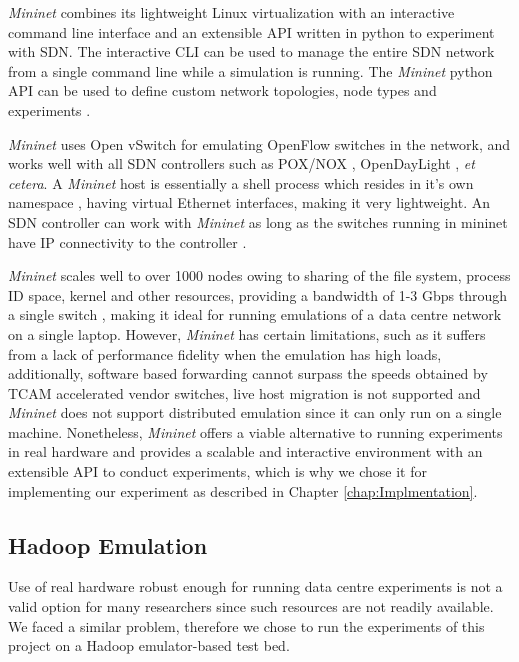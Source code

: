 \textit{Mininet} combines its lightweight Linux virtualization with an interactive command line interface and an extensible API written in python to experiment with SDN. The interactive CLI can be used to manage the entire SDN network from a single command line while a simulation is running. The \textit{Mininet} python API can be used to define custom network topologies, node types and experiments \cite{lantz2010network}.

\textit{Mininet} uses Open vSwitch \cite{OpenvSwitch} for emulating OpenFlow switches in the network, and works well with all SDN controllers such as POX/NOX \cite{gude2008nox}, OpenDayLight \cite{ODL2016}, \textit{et cetera}. A \textit{Mininet} host is essentially a shell process which resides in it's own namespace \cite{lantz2010network}, having virtual Ethernet interfaces,  making it very lightweight. An SDN controller can work with \textit{Mininet} as long as the switches running in mininet have IP connectivity to the controller \cite{lantz2010network}.

\textit{Mininet} scales well to over 1000 nodes owing to sharing of the file system, process ID space, kernel and other resources, providing a bandwidth of 1-3 Gbps through a single switch \cite{lantz2010network}, making it ideal for running emulations of a data centre network on a single laptop. However, \textit{Mininet} has certain limitations, such as it suffers from a lack of performance fidelity when the emulation has high loads, additionally, software based forwarding cannot surpass the speeds obtained by TCAM accelerated vendor switches, live host migration is not supported and \textit{Mininet} does not support distributed emulation since it can only run on a single machine. Nonetheless, \textit{Mininet} offers a viable alternative to running experiments in real hardware and provides a scalable and interactive environment with an extensible API to conduct experiments, which is why we chose it for implementing our experiment as described in Chapter \ref{chap:Implmentation}.  


\subsection{Hadoop Emulation} \label{subsec:Mremu}

Use of real hardware robust enough for running data centre experiments is not a valid option for many researchers since such resources are not readily available. We faced a similar problem, therefore we chose to run the experiments of this project on a Hadoop emulator-based test bed.   

